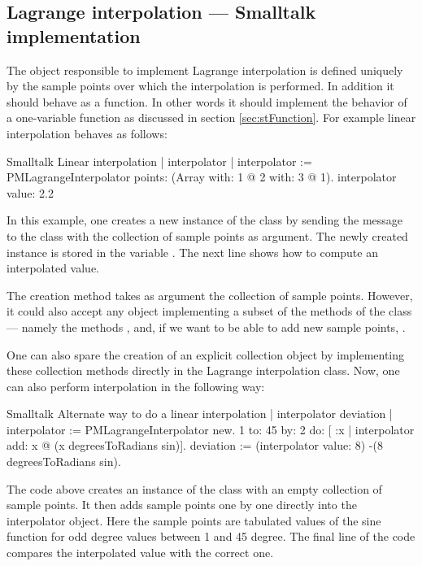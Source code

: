 \subsection{Lagrange interpolation --- Smalltalk implementation}
\label{sec:slagrange} The object
responsible to implement Lagrange interpolation is defined
uniquely by the sample points over which the interpolation is
performed. In addition it should behave as a function. In other
words it should implement the behavior of a one-variable function
as discussed in section \ref{sec:stFunction}. For example linear
interpolation behaves as follows:

\begin{listing}[label=ex:lagrangeS1]{Smalltalk}
{Linear interpolation}
| interpolator |
interpolator := PMLagrangeInterpolator
                        points: (Array with: 1 @ 2
                                        with: 3 @ 1).
interpolator value: 2.2
\end{listing}

In this example, one creates a new instance of the class  by sending the message  to the class  with the collection of
sample points as argument.
The newly created instance is stored in the variable .
The next line shows how to compute an interpolated value.

The creation method  takes as argument the collection
of sample points. However, it could also accept any object
implementing a subset of the methods of the class 
--- namely the methods ,  and, if we want to be
able to add new sample points, .

One can also spare the creation of an explicit collection object
by implementing these collection methods directly in the Lagrange
interpolation class.
Now, one can also perform interpolation in the following way:

\begin{listing}[label=ex:lagrangeS2]{Smalltalk}
{Alternate way to do a linear interpolation}
| interpolator deviation |
interpolator := PMLagrangeInterpolator new.
1 to: 45 by: 2 do:
                [ :x | interpolator add: x @ (x degreesToRadians sin)].
deviation := (interpolator value: 8) -(8 degreesToRadians sin).
\end{listing}

The code above creates an instance of the class  with an empty collection of sample points. It then adds sample points one by one directly into the
interpolator object. Here the sample points are tabulated values
of the sine function for odd degree values between 1 and 45
degree. The final line of the code compares the interpolated value
with the correct one.


